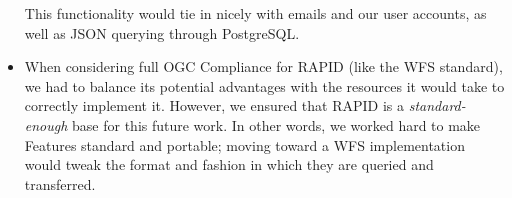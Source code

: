 \begin{itemize}
     This functionality would tie in nicely with emails and our user accounts, as well as JSON querying through PostgreSQL.
    
    \item When considering full OGC Compliance for RAPID (like the WFS standard), we had to balance its potential advantages with the resources it would take to correctly implement it. However, we ensured that RAPID is a \textit{standard-enough} base for this future work. In other words, we worked hard to make Features standard and portable; moving toward a WFS implementation would tweak the format and fashion in which they are queried and transferred.

\end{itemize}
